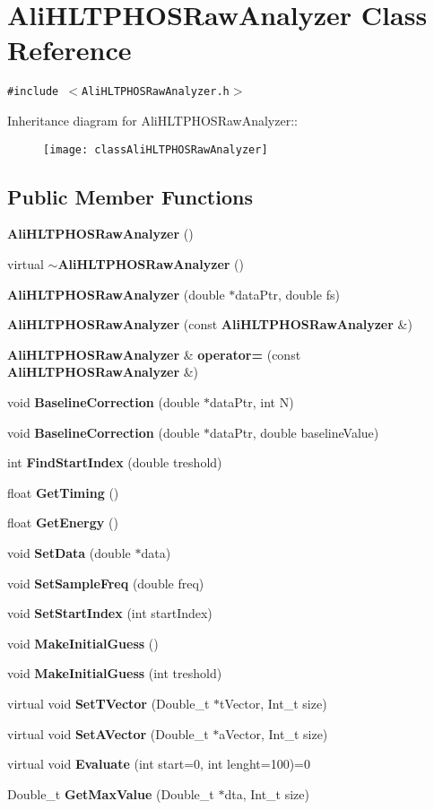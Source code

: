 \section{Ali\-HLTPHOSRaw\-Analyzer Class Reference}
\label{classAliHLTPHOSRawAnalyzer}
{\tt \#include $<$Ali\-HLTPHOSRaw\-Analyzer.h$>$}

Inheritance diagram for Ali\-HLTPHOSRaw\-Analyzer::\begin{figure}[H]
\begin{center}
\leavevmode
\texttt{[image: classAliHLTPHOSRawAnalyzer]}
\end{center}
\end{figure}
\subsection*{Public Member Functions}
\begin{CompactItemize}
\item 
{\bf Ali\-HLTPHOSRaw\-Analyzer} ()
\item 
virtual {\bf $\sim$Ali\-HLTPHOSRaw\-Analyzer} ()
\item 
{\bf Ali\-HLTPHOSRaw\-Analyzer} (double $\ast$data\-Ptr, double fs)
\item 
{\bf Ali\-HLTPHOSRaw\-Analyzer} (const {\bf Ali\-HLTPHOSRaw\-Analyzer} \&)
\item 
{\bf Ali\-HLTPHOSRaw\-Analyzer} \& {\bf operator=} (const {\bf Ali\-HLTPHOSRaw\-Analyzer} \&)
\item 
void {\bf Baseline\-Correction} (double $\ast$data\-Ptr, int N)
\item 
void {\bf Baseline\-Correction} (double $\ast$data\-Ptr, double baseline\-Value)
\item 
int {\bf Find\-Start\-Index} (double treshold)
\item 
float {\bf Get\-Timing} ()
\item 
float {\bf Get\-Energy} ()
\item 
void {\bf Set\-Data} (double $\ast$data)
\item 
void {\bf Set\-Sample\-Freq} (double freq)
\item 
void {\bf Set\-Start\-Index} (int start\-Index)
\item 
void {\bf Make\-Initial\-Guess} ()
\item 
void {\bf Make\-Initial\-Guess} (int treshold)
\item 
virtual void {\bf Set\-TVector} (Double\_\-t $\ast$t\-Vector, Int\_\-t size)
\item 
virtual void {\bf Set\-AVector} (Double\_\-t $\ast$a\-Vector, Int\_\-t size)
\item 
virtual void {\bf Evaluate} (int start=0, int lenght=100)=0
\item 
Double\_\-t {\bf Get\-Max\-Value} (Double\_\-t $\ast$dta, Int\_\-t size)
\end{CompactItemize}
